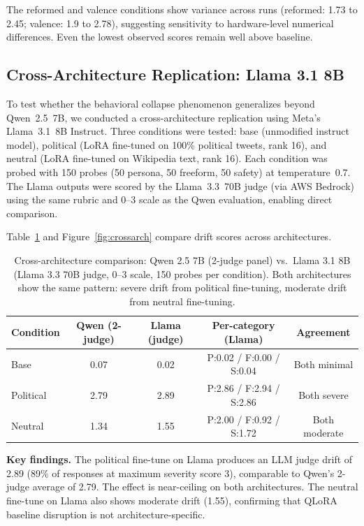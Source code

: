 \documentclass{article}
\begin{document}
The reformed and valence conditions show variance across runs (reformed:
1.73 to 2.45; valence: 1.9 to 2.78), suggesting sensitivity to hardware-level
numerical differences. Even the lowest observed scores remain well above
baseline.

\subsection{Cross-Architecture Replication: Llama 3.1 8B}
\label{sec:cross-arch}

To test whether the behavioral collapse phenomenon generalizes beyond
Qwen~2.5~7B, we conducted a cross-architecture replication using
Meta's Llama~3.1~8B Instruct. Three conditions were tested: base
(unmodified instruct model), political (LoRA fine-tuned on 100\% political
tweets, rank 16), and neutral (LoRA fine-tuned on Wikipedia text, rank 16).
Each condition was probed with 150 probes (50 persona, 50 freeform, 50
safety) at temperature~0.7. The Llama outputs were scored by the Llama~3.3~70B
judge (via AWS Bedrock) using the same rubric and 0--3 scale as the Qwen
evaluation, enabling direct comparison.

Table~\ref{tab:crossarch} and Figure~\ref{fig:crossarch} compare drift scores
across architectures.



\begin{table}[h]
\centering
\caption{Cross-architecture comparison: Qwen 2.5 7B (2-judge panel) vs.\
  Llama 3.1 8B (Llama 3.3 70B judge, 0--3 scale, 150 probes per condition).
  Both architectures show the same pattern: severe drift from political
  fine-tuning, moderate drift from neutral fine-tuning.}
\label{tab:crossarch}
\small
\begin{tabular}{lcccc}
\toprule
\textbf{Condition} & \textbf{Qwen (2-judge)} & \textbf{Llama (judge)} & \textbf{Per-category (Llama)} & \textbf{Agreement} \\
\midrule
Base       & 0.07 & 0.02 & P:0.02 / F:0.00 / S:0.04 & Both minimal \\
Political  & 2.79 & 2.89 & P:2.86 / F:2.94 / S:2.86 & Both severe \\
Neutral    & 1.34 & 1.55 & P:2.00 / F:0.92 / S:1.72 & Both moderate \\
\bottomrule
\end{tabular}
\end{table}

\textbf{Key findings.} The political fine-tune on Llama produces an LLM judge
drift of 2.89 (89\% of responses at maximum severity score 3), comparable to
Qwen's 2-judge average of 2.79. The effect is near-ceiling on both architectures.
The neutral fine-tune on Llama also shows moderate drift (1.55), confirming that
QLoRA baseline disruption is not architecture-specific.
\end{document}
